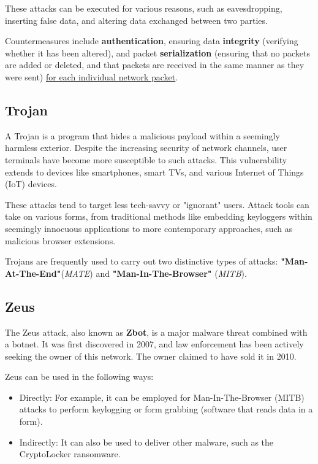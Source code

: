 These attacks can be executed for various reasons, such as eavesdropping, inserting false data, and altering data exchanged between two parties.


Countermeasures include \textbf{authentication}, ensuring data \textbf{integrity} (verifying whether it has been altered), and packet \textbf{serialization} (ensuring that no packets are added or deleted, and that packets are received in the same manner as they were sent) \ul{for each individual network packet}.




\subsection{Trojan}
A Trojan is a program that hides a malicious payload within a seemingly harmless exterior. Despite the increasing security of network channels, user terminals have become more susceptible to such attacks. This vulnerability extends to devices like smartphones, smart TVs, and various Internet of Things (IoT) devices.

These attacks tend to target less tech-savvy or "ignorant" users. Attack tools can take on various forms, from traditional methods like embedding keyloggers within seemingly innocuous applications to more contemporary approaches, such as malicious browser extensions.

Trojans are frequently used to carry out two distinctive types of attacks: \textbf{"Man-At-The-End"}(\emph{MATE}) and \textbf{"Man-In-The-Browser"} (\emph{MITB}).


\subsection{Zeus}
The Zeus attack, also known as \textbf{Zbot}, is a major malware threat combined with a botnet. It was first discovered in 2007, and law enforcement has been actively seeking the owner of this network. The owner claimed to have sold it in 2010.

Zeus can be used in the following ways:
\begin{itemize}
	\item Directly: For example, it can be employed for Man-In-The-Browser (MITB) attacks to perform keylogging or form grabbing (software that reads data in a form).
	\item Indirectly: It can also be used to deliver other malware, such as the CryptoLocker ransomware.
\end{itemize}

